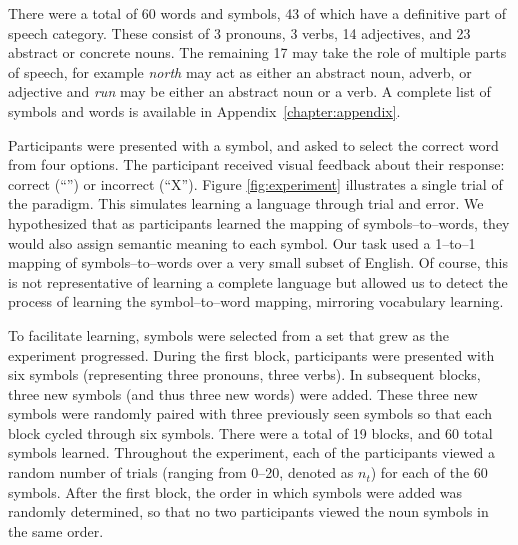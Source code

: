 There were a total of 60 words and symbols, 43 of which have a definitive part 
of speech category. These consist of 3 pronouns, 3 verbs, 14 adjectives, and 23 
abstract or concrete nouns. The remaining 17 may take the role of multiple 
parts of speech, for example \emph{north} may act as either an abstract noun, 
adverb, or adjective and \emph{run} may be either an abstract noun or a verb. A 
complete list of symbols and words is available in 
Appendix~\ref{chapter:appendix}.

Participants were presented with a symbol, and asked to select the correct word 
from four options. The participant received visual feedback about their 
response: correct (``\CheckmarkBold'') or incorrect (``X''). Figure 
\ref{fig:experiment} illustrates a single trial of the paradigm. This simulates 
learning a language through trial and error. We hypothesized that as 
participants learned the mapping of symbols--to--words, they would also assign 
semantic meaning to each symbol. Our task used a 1--to--1 mapping of 
symbols--to--words over a very small subset of English. Of course, this is not 
representative of learning a complete language but allowed us to detect the 
process of learning the symbol--to--word mapping, mirroring vocabulary 
learning.

To facilitate learning, symbols were selected from a set that grew as the 
experiment progressed. During the first block, participants were presented with 
six symbols (representing three pronouns, three verbs). In subsequent blocks, 
three new symbols (and thus three new words) were added. These three new 
symbols were randomly paired with three previously seen symbols so that each 
block cycled through six symbols. There were a total of 19 blocks, and 60 total 
symbols learned. Throughout the experiment, each of the participants viewed a 
random number of trials (ranging from 0--20, denoted as $n_t$) for each of the 
60 symbols. After the first block, the order in which symbols were added was 
randomly determined, so that no two participants viewed the noun symbols in the 
same order.
  
